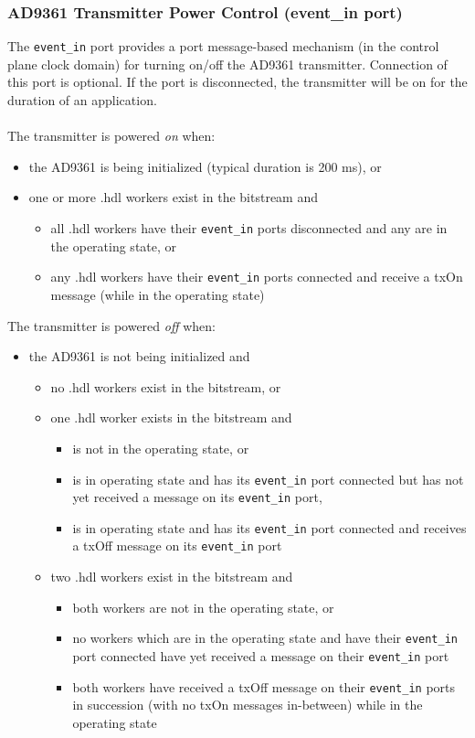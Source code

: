 \subsubsection*{AD9361 Transmitter Power Control (event\_in port)}
\noindent The \verb+event_in+ port provides a port message-based mechanism (in the control plane clock domain) for turning on/off the AD9361 transmitter. Connection of this port is optional. If the port is disconnected, the transmitter will be on for the duration of an application. \\ \\
\noindent The transmitter is powered \textit{on} when:
\begin{itemize}
  \item the AD9361 is being initialized (typical duration is 200 ms), or
  \item one or more \comp.hdl workers exist in the bitstream and
    \begin{itemize}
      \item all \comp.hdl workers have their \verb+event_in+ ports disconnected and any are in the operating state, or
      \item any \comp.hdl workers have their \verb+event_in+ ports connected and receive a txOn message (while in the operating state)
    \end{itemize}
\end{itemize}
The transmitter is powered \textit{off} when:
\begin{itemize}
  \item the AD9361 is not being initialized and
  \begin{itemize}
    \item no \comp.hdl workers exist in the bitstream, or
    \item one \comp.hdl worker exists in the bitstream and
      \begin{itemize}
        \item is not in the operating state, or
        \item is in operating state and has its \verb+event_in+ port connected but has not yet received a message on its \verb+event_in+ port,
        \item is in operating state and has its \verb+event_in+ port connected and receives a txOff message on its \verb+event_in+ port
      \end{itemize}
    \item two \comp.hdl workers exist in the bitstream and
      \begin{itemize}
        \item both workers are not in the operating state, or
        \item no workers which are in the operating state and have their \verb+event_in+ port connected have yet received a message on their \verb+event_in+ port
        \item both workers have received a txOff message on their \verb+event_in+ ports in succession (with no txOn messages in-between) while in the operating state
      \end{itemize}
  \end{itemize}
\end{itemize}
